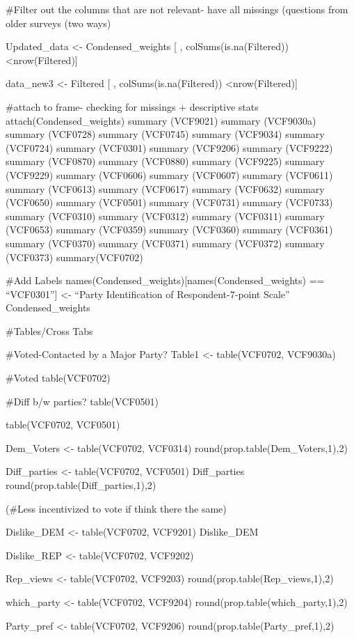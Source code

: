 \documentclass[
]{article}
\begin{document}
\#Filter out the columns that are not relevant- have all missings
(questions from older surveys (two ways)

Updated\_data \textless- Condensed\_weights {[} ,
colSums(is.na(Filtered)) \textless nrow(Filtered){]}

data\_new3 \textless- Filtered {[} , colSums(is.na(Filtered))
\textless nrow(Filtered){]}

\#attach to frame- checking for missings + descriptive stats
attach(Condensed\_weights) summary (VCF9021) summary (VCF9030a) summary
(VCF0728) summary (VCF0745) summary (VCF9034) summary (VCF0724) summary
(VCF0301) summary (VCF9206) summary (VCF9222) summary (VCF0870) summary
(VCF0880) summary (VCF9225) summary (VCF9229) summary (VCF0606) summary
(VCF0607) summary (VCF0611) summary (VCF0613) summary (VCF0617) summary
(VCF0632) summary (VCF0650) summary (VCF0501) summary (VCF0731) summary
(VCF0733) summary (VCF0310) summary (VCF0312) summary (VCF0311) summary
(VCF0653) summary (VCF0359) summary (VCF0360) summary (VCF0361) summary
(VCF0370) summary (VCF0371) summary (VCF0372) summary (VCF0373)
summary(VCF0702)

\#Add Labels names(Condensed\_weights){[}names(Condensed\_weights) ==
``VCF0301''{]} \textless- ``Party Identification of Respondent-7-point
Scale'' Condensed\_weights

\#Tables/Cross Tabs

\#Voted-Contacted by a Major Party? Table1 \textless- table(VCF0702,
VCF9030a)

\#Voted table(VCF0702)

\#Diff b/w parties? table(VCF0501)

table(VCF0702, VCF0501)

Dem\_Voters \textless- table(VCF0702, VCF0314)
round(prop.table(Dem\_Voters,1),2)

Diff\_parties \textless- table(VCF0702, VCF0501) Diff\_parties
round(prop.table(Diff\_parties,1),2)

(\#Less incentivized to vote if think there the same)

Dislike\_DEM \textless- table(VCF0702, VCF9201) Dislike\_DEM

Dislike\_REP \textless- table(VCF0702, VCF9202)

Rep\_views \textless- table(VCF0702, VCF9203)
round(prop.table(Rep\_views,1),2)

which\_party \textless- table(VCF0702, VCF9204)
round(prop.table(which\_party,1),2)

Party\_pref \textless- table(VCF0702, VCF9206)
round(prop.table(Party\_pref,1),2)
\end{document}
